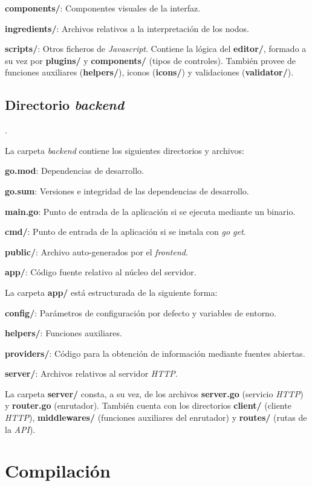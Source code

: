 \textbf{components/}: Componentes visuales de la interfaz.

\textbf{ingredients/}: Archivos relativos a la interpretación de los nodos.

\textbf{scripts/}: Otros ficheros de \textit{Javascript}. Contiene la lógica del \textbf{editor/}, formado a su vez por \textbf{plugins/} y \textbf{components/} (tipos de controles). También provee de funciones auxiliares (\textbf{helpers/}), iconos (\textbf{icons/}) y validaciones (\textbf{validator/}).

\subsection{Directorio \textit{backend}} \label{sub:backenddir}.

La carpeta \textit{backend} contiene los siguientes directorios y archivos:\sn

\textbf{go.mod}: Dependencias de desarrollo.

\textbf{go.sum}: Versiones e integridad de las dependencias de desarrollo.

\textbf{main.go}: Punto de entrada de la aplicación si se ejecuta mediante un binario.

\textbf{cmd/}: Punto de entrada de la aplicación si se instala con \textit{go get}.

\textbf{public/}: Archivo auto-generados por el \textit{frontend}.

\textbf{app/}: Código fuente relativo al núcleo del servidor.\sn

La carpeta \textbf{app/} está estructurada de la siguiente forma:\sn

\textbf{config/}: Parámetros de configuración por defecto y variables de entorno.

\textbf{helpers/}: Funciones auxiliares.

\textbf{providers/}: Código para la obtención de información mediante fuentes abiertas.

\textbf{server/}: Archivos relativos al servidor \textit{HTTP}.\sn

La carpeta \textbf{server/} consta, a su vez, de los archivos \textbf{server.go} (servicio \textit{HTTP}) y \textbf{router.go} (enrutador). También cuenta con los directorios \textbf{client/} (cliente \textit{HTTP}), \textbf{middlewares/} (funciones auxiliares del enrutador) y \textbf{routes/} (rutas de la \textit{API}).\n

\section{Compilación} \label{sec:compilation}

